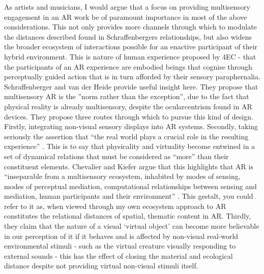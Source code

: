 As artists and musicians, I would argue that a focus on providing multisensory engagement in an AR work be of paramount importance in most of the above considerations. This not only provides more channels through which to modulate the distances described found in Schraffenbergers relationships, but also widens the broader ecosystem of interactions possible for an enactive participant of their hybrid environment. This is nature of human experience proposed by 4EC - that the participants of an AR experience are embodied beings that cognise through perceptually guided action that is in turn afforded by their sensory paraphernalia. Schraffenberger and van der Heide provide useful insight here. They propose that multisensory AR is the ”norm rather than the exception”, due to the fact that physical reality is already multisensory, despite the ocularcentrism found in AR devices. They propose three routes through which to pursue this kind of design. Firstly, integrating non-visual sensory displays into  AR systems. Secondly, taking seriously the assertion that “the real world plays a crucial role in the resulting experience” \citep[p. 5]{schraffenberger2016}. This is to say that physicality and virtuality become entwined in a set of dynamical relations that must be considered as “more” than their constituent elements. Chevalier and Kiefer argue that this highlights that AR is “inseparable from a multisensory ecosystem, inhabited by modes of sensing, modes of perceptual mediation, computational relationships between sensing and mediation, human participants and their environment” \citeyearpar[p. 4]{chevalier2020}. This gestalt, you could refer to it as, when viewed through my own ecosystem approach to AR constitutes the relational distances of spatial, thematic content in AR. Thirdly, they claim that the nature of a visual ‘virtual object’ can become more believable in our perception of it if it behaves and is affected by non-visual real-world environmental stimuli - such as the virtual creature visually responding to external sounds - this has the effect of closing the material and ecological distance despite not providing virtual non-visual stimuli itself. 

